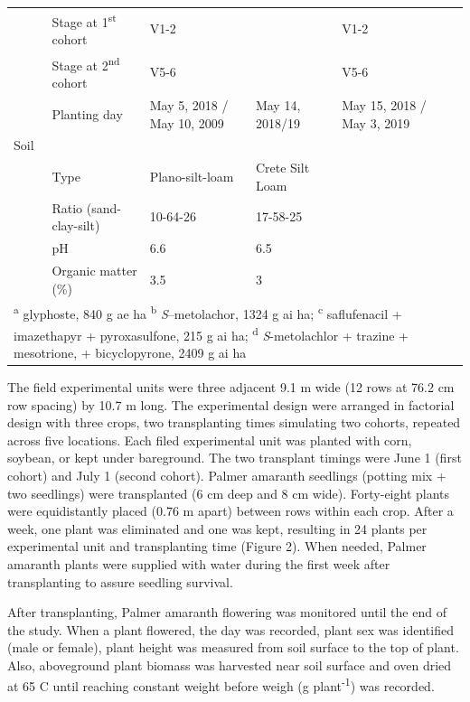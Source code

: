 \documentclass[utf8]{frontiersSCNS}
\begin{document}
\begin{table}[!h]
{\begin{tabular}[t]{lllllll}
 & Stage at 1\textsuperscript{st} cohort & V1-2 &  & V1-2 &  & \\

 & Stage at 2\textsuperscript{nd} cohort & V5-6 &  & V5-6 &  & \\

\multirow{-6}{*}{\raggedright\arraybackslash } & Planting day & May 5, 2018 / May 10, 2009 & May 14, 2018/19 & May 15, 2018 / May 3, 2019 &  & \\

Soil &  &  &  &  &  & \\

 & Type & Plano-silt-loam & Crete Silt Loam &  &  & \\

 & Ratio (sand-clay-silt) & 10-64-26 & 17-58-25 &  &  & \\

 & pH & 6.6 & 6.5 &  &  & \\

\multirow{-4}{*}{\raggedright\arraybackslash } & Organic matter (\%) & 3.5 & 3 &  &  & \\
\bottomrule
\multicolumn{7}{l}{\rule{0pt}{1em}\textsuperscript{a} glyphoste, 840 g ae ha \textsuperscript{b} \emph{S}--metolachor, 1324 g ai ha; \textsuperscript{c} saflufenacil + imazethapyr + pyroxasulfone, 215 g ai ha; \textsuperscript{d} \emph{S}-metolachlor + trazine + mesotrione, + bicyclopyrone, 2409 g ai ha}\\
\end{tabular}}
\end{table}

The field experimental units were three adjacent 9.1 m wide (12 rows at
76.2 cm row spacing) by 10.7 m long. The experimental design were
arranged in factorial design with three crops, two transplanting times
simulating two cohorts, repeated across five locations. Each filed
experimental unit was planted with corn, soybean, or kept under
bareground. The two transplant timings were June 1 (first cohort) and
July 1 (second cohort). Palmer amaranth seedlings (potting mix + two
seedlings) were transplanted (6 cm deep and 8 cm wide). Forty-eight
plants were equidistantly placed (0.76 m apart) between rows within each
crop. After a week, one plant was eliminated and one was kept, resulting
in 24 plants per experimental unit and transplanting time (Figure 2).
When needed, Palmer amaranth plants were supplied with water during the
first week after transplanting to assure seedling survival.

After transplanting, Palmer amaranth flowering was monitored until the
end of the study. When a plant flowered, the day was recorded, plant sex
was identified (male or female), plant height was measured from soil
surface to the top of plant. Also, aboveground plant biomass was
harvested near soil surface and oven dried at 65 C until reaching
constant weight before weigh (g plant\textsuperscript{-1}) was recorded.
\end{document}
